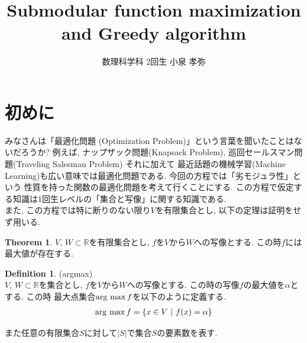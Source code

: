 \documentclass[11pt, a4paper, dvipdfmx]{jsarticle}
\title{Submodular function maximization and Greedy algorithm}
\author{数理科学科 2回生 小泉 孝弥}
\date{}
\theoremstyle{definition}
\newtheorem{Definition+}[Axiom+]{Definition}
\newtheorem{Theorem+}[Axiom+]{Theorem}
\newcommand{\R}{\mathbb{R}}
\begin{document}
\maketitle
\section{初めに}
みなさんは「最適化問題 (Optimization Problem)」という言葉を聞いたことはないだろうか? 
例えば, ナップザック問題(Knapsack Problem), 巡回セールスマン問題(Traveling Salesman Problem) それに加えて
最近話題の機械学習(Machine Learning)も広い意味では最適化問題である. 今回の方程では「劣モジュラ性」という
性質を持った関数の最適化問題を考えて行くことにする. この方程で仮定する知識は1回生レベルの「集合と写像」に関する知識である.\\ \indent
 また, この方程では特に断りのない限り$V$を有限集合とし, 以下の定理は証明をせず用いる.
 \begin{Theorem+}
    $V$, $W$$\subset\R$を有限集合とし, $f$を$V$から$W$への写像とする. この時$f$には最大値が存在する.
 \end{Theorem+}
 \begin{Definition+}(argmax)\\
     $V$, $W$$\subset\R$を集合とし, $f$を$V$から$W$への写像とする. この時の写像$f$の最大値を$\alpha$とする. この時
     最大点集合$\mathop{\rm arg~max}\limits f$を以下のように定義する. 
     \begin{align*}
        \mathop{\rm arg~max}\limits f = \{x\in V~|~ f(x) = \alpha\}
     \end{align*}
    \end{Definition+}
    また任意の有限集合$S$に対して$|S|$で集合$S$の要素数を表す.    
\end{document}
